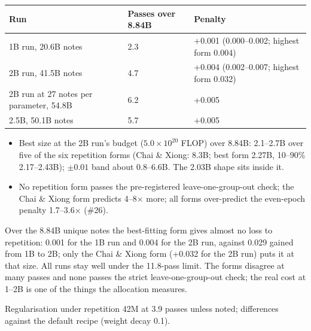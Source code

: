 \documentclass[11pt,a4paper]{article}
\makeatletter
\renewcommand\subsubsection{\@startsection{subsubsection}{3}{\z@}{-2.2ex \@plus -.5ex \@minus -.2ex}{0.8ex \@plus .2ex}%
  {\normalfont\normalsize\bfseries\color{head}}}
\makeatother
\begin{document}
\begin{tabularx}{\textwidth}{|L{5.6cm}|L{2.4cm}|X|}
\hline
\textbf{Run} & \textbf{Passes over 8.84B} & \textbf{Penalty}\\ \hline
1B run, 20.6B notes & 2.3 & +0.001 (0.000--0.002; highest form 0.004)\\ \hline
2B run, 41.5B notes & 4.7 & +0.004 (0.002--0.007; highest form 0.032)\\ \hline
2B run at 27 notes per parameter, 54.8B & 6.2 & +0.005\\ \hline
2.5B, 50.1B notes & 5.7 & +0.005\\ \hline
\end{tabularx}
\vspace{4pt}
\begin{itemize}
\item Best size at the 2B run's budget ($5.0\times10^{20}$ FLOP) over 8.84B: 2.1--2.7B over five of the six repetition forms (Chai \& Xiong: 8.3B; best
form 2.27B, 10--90\% 2.17--2.43B); $\pm0.01$ band about 0.8--6.6B. The 2.03B shape sits inside it.
\item No repetition form passes the pre-registered leave-one-group-out check; the Chai \& Xiong form
predicts 4--8$\times$ more; all forms over-predict the even-epoch penalty 1.7--3.6$\times$ (\#26).
\end{itemize}
Over the 8.84B unique notes the best-fitting form gives almost no loss to repetition: 0.001 for the 1B run and 0.004 for
the 2B run, against 0.029 gained from 1B to 2B; only the Chai \& Xiong form (+0.032 for the 2B run) puts it at that size. All runs stay well under the 11.8-pass limit. The forms disagree at many
passes and none passes the strict leave-one-group-out check; the real cost at 1--2B is one of the things the
allocation measures.

\subsubsection{Regularisation under repetition}
42M at 3.9 passes unless noted; differences against the default recipe (weight decay 0.1).
\end{document}
